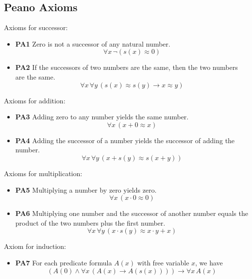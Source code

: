 \documentclass[11pt]{article}
\theoremstyle{definition}
\begin{document}
\subsection{Peano Axioms}
Axioms for successor:\vspace{-0.25cm}
\begin{itemize}[label={}]
\item {\bf PA1} Zero is not a successor of any natural number. $$\forall x \, \neg(s(x) \approx 0)$$
\item {\bf PA2} If the successors of two numbers are the same, then the two numbers are the same.
$$\forall x \, \forall y \, (s(x) \approx s(y) \to x \approx y)$$
\end{itemize}
\vspace{-0.25cm}
Axioms for addition:\vspace{-0.25cm}
\begin{itemize}[label={}]
\item {\bf PA3} Adding zero to any number yields the same number.
$$\forall x \, (x + 0 \approx x)$$
\item {\bf PA4} Adding the successor of a number yields the successor of adding the number.
$$\forall x \, \forall y \, (x + s(y) \approx s(x+y))$$
\end{itemize}
\vspace{-0.25cm}
Axioms for multiplication:\vspace{-0.25cm}
\begin{itemize}[label={}]
\item {\bf PA5} Multiplying a number by zero yields zero.
$$\forall x \, (x \cdot 0 \approx 0)$$
\item {\bf PA6} Multiplying one number and the successor of another number equals the product of the two numbers plus the first number.
$$\forall x \, \forall y \, (x \cdot s(y) \approx x \cdot y + x)$$
\end{itemize}
Axiom for induction:\vspace{-0.25cm}
\begin{itemize}[label={}]
\item {\bf PA7} For each predicate formula $A(x)$ with free variable $x$, we have
$$(A(0) \wedge \forall x \, (A(x) \to A(s(x)))) \to \forall x \, A(x)$$
\end{itemize}

\newpage
\end{document}
